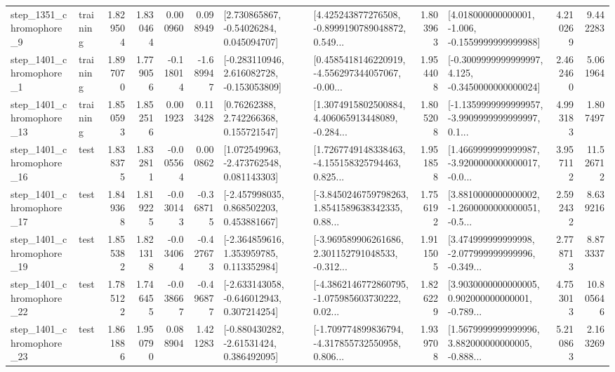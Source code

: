 \begin{tabular}{llrrrrllrlrr}
  step\_1351\_chromophore\_9 &  training &      1.829504 &    1.830464 &      0.000960 &  0.098949 &     [2.730865867, -0.54026284, 0.045094707] &  [4.425243877276508, -0.8999190789048872, 0.549... &       1.803963 &   [4.018000000000001, -1.006, -0.1559999999999988] &            4.210269 &          9.442283 \\
  step\_1401\_chromophore\_1 &  training &      1.897070 &    1.779056 &     -0.118014 & -1.689947 &   [-0.283110946, 2.616082728, -0.153053809] &  [0.4585418146220919, -4.556297344057067, -0.00... &       1.954408 &  [-0.3009999999999997, 4.125, -0.3450000000000024] &            2.462460 &          5.061964 \\
 step\_1401\_chromophore\_13 &  training &      1.850593 &    1.852516 &      0.001923 &  0.113428 &      [0.76262388, 2.742266368, 0.155721547] &  [1.3074915802500884, 4.406065913448089, -0.284... &       1.805208 &  [-1.1359999999999957, -3.9909999999999997, 0.1... &            4.993183 &          1.807497 \\
 step\_1401\_chromophore\_16 &      test &      1.838375 &    1.832811 &     -0.005564 &  0.000862 &    [1.072549963, -2.473762548, 0.081143303] &  [1.7267749148338463, -4.155158325794463, 0.825... &       1.951858 &  [1.4669999999999987, -3.9200000000000017, -0.0... &            3.957112 &         11.526712 \\
 step\_1401\_chromophore\_17 &      test &      1.849368 &    1.819225 &     -0.030143 & -0.368715 &    [-2.457998035, 0.868502203, 0.453881667] &  [-3.8450246759798263, 1.8541589638342335, 0.88... &       1.756192 &  [3.8810000000000002, -1.2600000000000051, -0.5... &            2.592432 &          8.639216 \\
 step\_1401\_chromophore\_19 &      test &      1.855382 &    1.821318 &     -0.034064 & -0.427673 &    [-2.364859616, 1.353959785, 0.113352984] &  [-3.969589906261686, 2.301152791048533, -0.312... &       1.911505 &  [3.474999999999998, -2.077999999999996, -0.349... &            2.778713 &          8.873337 \\
 step\_1401\_chromophore\_22 &      test &      1.785122 &    1.746455 &     -0.038667 & -0.496877 &   [-2.633143058, -0.646012943, 0.307214254] &  [-4.3862146772860795, -1.075985603730222, 0.02... &       1.826229 &  [3.9030000000000005, 0.902000000000001, -0.789... &            4.753013 &         10.805646 \\
 step\_1401\_chromophore\_23 &      test &      1.861886 &    1.950790 &      0.088904 &  1.421283 &    [-0.880430282, -2.61531424, 0.386492095] &  [-1.709774899836794, -4.317855732550958, 0.806... &       1.939708 &  [1.5679999999999996, 3.882000000000005, -0.888... &            5.210863 &          2.163269 \\

\end{tabular}
